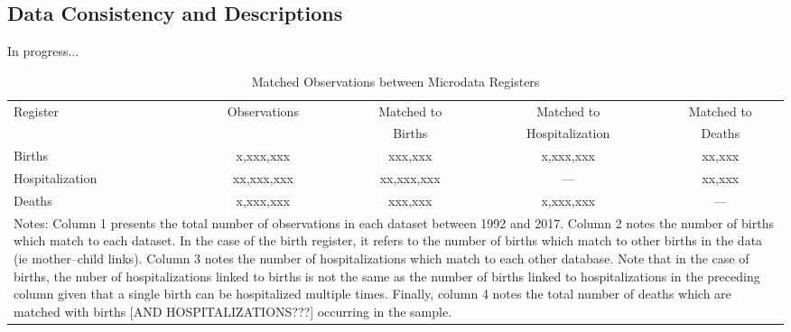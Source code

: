 \documentclass[11pt]{article}
\begin{document}
  \clearpage
  \begin{appendices}
  \setcounter{page}{1}
  \renewcommand{\thepage}{A\arabic{page}}
  \setcounter{table}{0}
  \renewcommand{\thetable}{A\arabic{table}}
  \setcounter{figure}{0}
  \renewcommand{\thefigure}{A\arabic{figure}}



  \section{Data Consistency and Descriptions}
  \label{app:data}
  In progress...


  \begin{table}[htpb!]
    \centering
    \caption{Matched Observations between Microdata Registers}
    \begin{tabular}{lcccc} \toprule
      Register & Observations & Matched to & Matched to  & Matched to \\
               &              & Births     & Hospitalization & Deaths \\ \midrule
      Births          & x,xxx,xxx  & xxx,xxx    & x,xxx,xxx & xx,xxx \\
      Hospitalization & xx,xxx,xxx & xx,xxx,xxx & ---       & xx,xxx \\
      Deaths          & x,xxx,xxx  & xxx,xxx    & x,xxx,xxx & ---    \\ \midrule
      \multicolumn{5}{p{12.4cm}}{\footnotesize Notes: Column 1 presents the
        total number of observations in each dataset between 1992 and 2017.
        Column 2 notes the number of births which match to each dataset.  In the
        case of the birth register, it refers to the number of births which match
        to other births in the data (ie mother--child links). Column 3 notes the
        number of hospitalizations which match to each other database.  Note that
        in the case of births, the nuber of hospitalizations linked to births is not
        the same as the number of births linked to hospitalizations in the preceding
        column given that a single birth can be hospitalized multiple times.  Finally,
        column 4 notes the total number of deaths which are matched with births
        [AND HOSPITALIZATIONS???] occurring in the sample.}
    \end{tabular}
  \end{table}



\end{appendices}
\end{document}
